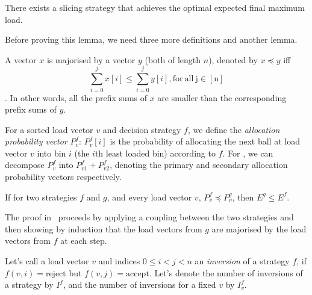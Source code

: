 \begin{lemma} \label{lemma: thresholdproperty}
There exists a slicing strategy that achieves the optimal expected final maximum load.
\end{lemma}


Before proving this lemma, we need three more definitions and another lemma.


\begin{definition} [majorisation]
A vector $x$ is majorised by a vector $y$ (both of length $n$), denoted by $x \preccurlyeq y$ iff $$\sum_{i=0}^j x[i] \leq \sum_{i=0}^j y[i]\mathrm{, for\ all\ j\in [n]}$$. In other words, all the prefix sums of $x$ are smaller than the corresponding prefix sums of $y$.
\end{definition}


\begin{definition} 
For a sorted load vector $v$ and decision strategy $f$, we define the \textit{allocation probability vector} $P^f_v$: $P^f_v[i]$ is the probability of allocating the next ball at load vector $v$ into bin $i$ (the $i$th least loaded bin) according to $f$. For \TwoThinning, we can decompose $P^f_v$ into $P^f_{v1}+P^f_{v2}$, denoting the primary and secondary allocation probability vectors respectively.
\end{definition}


\begin{lemma}  \label{lemma: majorisation-implies-better}
If for two strategies $f$ and $g$, and every load vector $v$, $P^f_v\preccurlyeq P^g_v$, then $E^g\leq E^f$.
\end{lemma}

\begin{remark}
The proof in~\cite{azar1999twochoice} proceeds by applying a coupling between the two strategies and then showing by induction that the load vectors from $g$ are majorised by the load vectors from $f$ at each step.
\end{remark}


\begin{definition} 
Let's call a load vector $v$ and indices $0\leq i<j<n$ an \textit{inversion} of a strategy $f$, if $f(v,i)=\mathrm{reject}$ but $f(v,j)=\mathrm{accept}$. Let's denote the number of inversions of a strategy by $I^f$, and the number of inversions for a fixed $v$ by $I^f_v$.
\end{definition}


